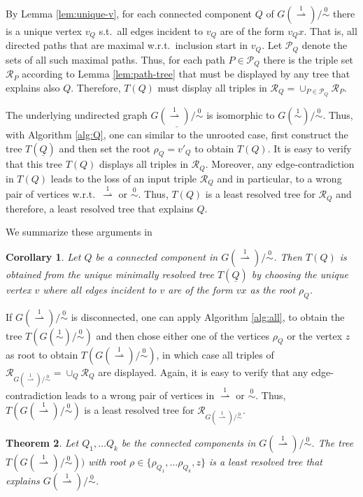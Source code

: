 \documentclass[smallextended]{svjour3}
\newcommand{\rev}[1]{\begingroup\color{blue}#1\endgroup}
\newcommand{\TODO}[1]{\begingroup\color{red}#1\endgroup}
\newcommand{\Ro}{\mathrel{\overset{0}{\sim}}}
\newcommand{\Rl}{\mathrel{\overset{1}{\sim}}}
\newcommand{\Rld}{\mathrel{\overset{1}{\rightharpoonup}}}
\newtheorem{thm}{Theorem}
\newtheorem{cor}[thm]{Corollary}
\begin{document}
By Lemma \ref{lem:unique-v}, for each connected component $Q$ of
$G(\Rld)/\Ro$ there is a unique vertex $v_Q$ s.t.\ all edges incident to
$v_Q$ are of the form $v_Qx$. That is, all directed paths that are maximal
w.r.t.\ inclusion start in $v_Q$.  Let $\mathcal P_Q$ denote the sets of
all such maximal paths.  Thus, for each path $P \in \mathcal P_Q$
there is the triple set $\mathcal{R}_{P}$ according to Lemma
\ref{lem:path-tree} that must be displayed by any tree that explains also
$Q$.  Therefore, $T(Q)$ must display all triples in $\mathcal{R}_Q =
\cup_{P\in \mathcal{P}_Q} \mathcal{R}_{P}$.

The underlying undirected graph $\underline{G(\Rld)/\Ro}$ is isomorphic to
$G(\Rl)/\Ro$. Thus, with Algorithm \ref{alg:Q}, one can similar to the
unrooted case, first construct the tree $T(\underline{Q})$ and then set the
root $\rho_Q=v'_Q$ to obtain $T(Q)$.  It is easy to verify that this tree
$T(Q)$ displays all triples in $\mathcal{R}_Q$.  Moreover, any
edge-contradiction in $T(Q)$ leads to the loss of an input triple
$\mathcal{R}_Q$ and in particular, to a wrong pair of vertices w.r.t.\
$\Rld$ or $\Ro$.  Thus, $T(Q)$ is a least resolved tree for
$\mathcal{R}_Q$ and therefore, a least resolved tree that explains $Q$.

We summarize these arguments in
\begin{cor} 
  Let $Q$ be a connected component in $G(\Rld)/\Ro$. Then $T(Q)$ is
  obtained from the unique \rev{minimally} resolved tree $T(\underline{Q})$ by
  choosing the unique vertex $v$ where all edges incident to $v$ are of the
  form $vx$ as the root $\rho_Q$. %
\label{cor:Q-root}
\end{cor}

If $G(\Rld)/\Ro$ is disconnected, one can apply Algorithm \ref{alg:all}, to
obtain the tree $T(G(\Rl)/\Ro)$ and then chose either one of the vertices
$\rho_Q$ or the vertex $z$ as root to obtain $T(G(\Rld)/\Ro)$, in which
case all triples of $\mathcal{R}_{G(\Rld)/\Ro} = \cup_Q \mathcal R_Q$ are
displayed. Again, it is easy to verify that any edge-contradiction leads to
a wrong pair of vertices in $\Rld$ or $\Ro$. Thus, $T(G(\Rld)/\Ro)$ is a
least resolved tree for $\mathcal{R}_{G(\Rld)/\Ro}$.


\begin{thm}
  Let $Q_1,\dots Q_k$ be the connected components in $G(\Rld)/\Ro$. 
 \rev{ The tree $T(G(\Rld)/\Ro))$ with root 
  $\rho\in \{\rho_{Q_1},\ldots \rho_{Q_k}, z\}$
	is a least resolved tree that explains
  $G(\Rld)/\Ro$.		}
  \label{thm:star-tree-dir}
\end{thm}
\end{document}
